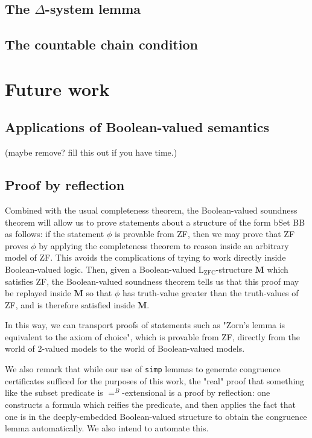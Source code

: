 \documentclass[a4paper,USenglish,cleveref, autoref]{lipics-v2019}
\begin{document}
\subsection{The $\Delta$-system lemma}

\subsection{The countable chain condition}

\section{Future work}

\subsection{Applications of Boolean-valued semantics}

(maybe remove? fill this out if you have time.)
\subsection{Proof by reflection}

Combined with the usual completeness theorem, the Boolean-valued soundness theorem will allow us to prove statements about a structure of the form bSet BB as follows: if the statement $\phi$ is provable from ZF, then we may prove that ZF proves $\phi$ by applying the completeness theorem to reason inside an arbitrary model of ZF. This avoids the complications of trying to work directly inside Boolean-valued logic. Then, given a Boolean-valued L\(_{\text{ZFC}}\)-structure $\mathbf{M}$ which satisfies ZF, the Boolean-valued soundness theorem tells us that this proof may be replayed inside $\mathbf{M}$ so that $\phi$ has truth-value greater than the truth-values of ZF, and is therefore satisfied inside $\mathbf{M}$.

In this way, we can transport proofs of statements such as "Zorn's lemma is equivalent to the axiom of choice", which is provable from ZF, directly from the world of 2-valued models to the world of Boolean-valued models.

We also remark that while our use of \texttt{simp} lemmas to generate congruence certificates sufficed for the purposes of this work, the "real" proof that something like the subset predicate is $=^B$-extensional is a proof by reflection: one constructs a formula which reifies the predicate, and then applies the fact that one is in the deeply-embedded Boolean-valued structure to obtain the congruence lemma automatically. We also intend to automate this.
\end{document}
